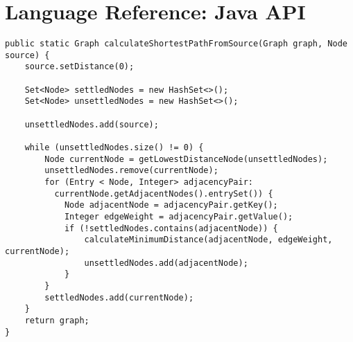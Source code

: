 \documentclass[
a4paper, %
11pt, %
onecolumn, %
openany, %
]{memoir}
\begin{document}
\chapter{Language Reference: Java API}
\begin{verbatim}
public static Graph calculateShortestPathFromSource(Graph graph, Node source) {
    source.setDistance(0);
 
    Set<Node> settledNodes = new HashSet<>();
    Set<Node> unsettledNodes = new HashSet<>();
 
    unsettledNodes.add(source);
 
    while (unsettledNodes.size() != 0) {
        Node currentNode = getLowestDistanceNode(unsettledNodes);
        unsettledNodes.remove(currentNode);
        for (Entry < Node, Integer> adjacencyPair: 
          currentNode.getAdjacentNodes().entrySet()) {
            Node adjacentNode = adjacencyPair.getKey();
            Integer edgeWeight = adjacencyPair.getValue();
            if (!settledNodes.contains(adjacentNode)) {
                calculateMinimumDistance(adjacentNode, edgeWeight, currentNode);
                unsettledNodes.add(adjacentNode);
            }
        }
        settledNodes.add(currentNode);
    }
    return graph;
}
\end{verbatim}
\backmatter


% 
% 
\end{document}
